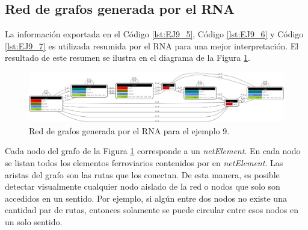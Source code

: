 \subsection{Red de grafos generada por el RNA}

	La información exportada en el Código \ref{lst:EJ9_5}, Código \ref{lst:EJ9_6} y Código \ref{lst:EJ9_7} es utilizada resumida por el RNA para una mejor interpretación. El resultado de este resumen se ilustra en el diagrama de la Figura \ref{fig:EJ9_8}.
	
	\begin{figure}[H]
		\centering
		\includegraphics[width=1\textwidth]{Figuras/Graph_9}
		\centering\caption{Red de grafos generada por el RNA para el ejemplo 9.}
		\label{fig:EJ9_8}
	\end{figure}
	
	Cada nodo del grafo de la Figura \ref{fig:EJ9_8} corresponde a un \textit{netElement}. En cada nodo se listan todos los elementos ferroviarios contenidos por en \textit{netElement}. Las aristas del grafo son las rutas que los conectan. De esta manera, es posible detectar visualmente cualquier nodo aislado de la red o nodos que solo son accedidos en un sentido. Por ejemplo, si algún entre dos nodos no existe una cantidad par de rutas, entonces solamente se puede circular entre esos nodos en un solo sentido.